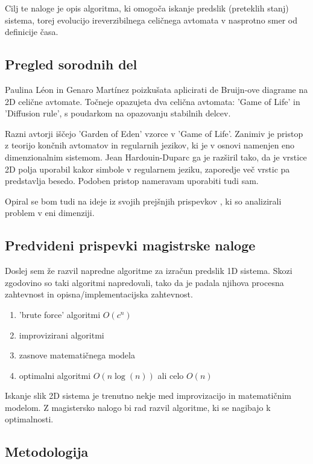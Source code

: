 \documentclass[a4paper, 12pt]{article}
\begin{document}
Cilj te naloge je opis algoritma, ki omogoča iskanje predslik (preteklih stanj) sistema, torej evolucijo
ireverzibilnega celičnega avtomata v nasprotno smer od definicije časa.

\subsection{Pregled sorodnih del}

Paulina Léon in Genaro Martínez \cite{PaulinaGenaro2016} poizkušata aplicirati
de Bruijn-ove diagrame na 2D celične avtomate. Točneje opazujeta dva celična avtomata:
'Game of Life' in 'Diffusion rule', s poudarkom na opazovanju stabilnih delcev.

Razni avtorji \cite{Hartman2013} iščejo 'Garden of Eden' vzorce v 'Game of Life'.
Zanimiv je pristop z teorijo končnih avtomatov in regularnih jezikov, ki je v
osnovi namenjen eno dimenzionalnim sistemom. Jean Hardouin-Duparc ga je razširil
tako, da je vrstice 2D polja uporabil kakor simbole v regularnem jeziku, zaporedje več
vrstic pa predstavlja besedo. Podoben pristop nameravam uporabiti tudi sam.

Opiral se bom tudi na ideje iz svojih prejšnjih prispevkov \cite{JerasDobnikar2007}
\cite{DBLP:conf/iccS/JerasD06} \cite{DBLP:conf/automata/Jeras08},
ki so analizirali problem v eni dimenziji.

\subsection{Predvideni prispevki magistrske naloge}

Doslej sem že razvil napredne algoritme za izračun predslik 1D sistema.
Skozi zgodovino so taki algoritmi napredovali, tako da je padala njihova
procesna zahtevnost in opisna/implementacijska zahtevnost.
\begin{enumerate}
\item 'brute force' algoritmi \( O(c^n) \)
\item improvizirani algoritmi
\item zasnove matematičnega modela
\item optimalni algoritmi \( O(n \log(n)) \) ali celo \( O(n) \)
\end{enumerate}
Iskanje slik 2D sistema je trenutno nekje med improvizacijo in matematičnim modelom.
Z magistersko nalogo bi rad razvil algoritme, ki se nagibajo k optimalnosti.

\subsection{Metodologija}
\end{document}

